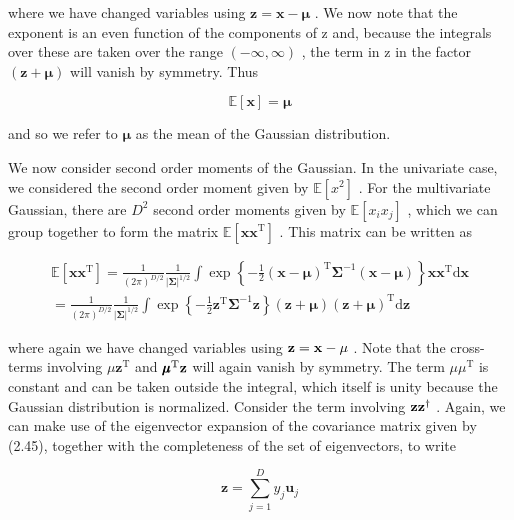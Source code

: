 \documentclass[
  10
]{article}
\begin{document}
where we have changed variables using
\(\mathbf { z } = \mathbf { x } - \pmb { \mu }\) . We now note that the
exponent is an even function of the components of z and, because the
integrals over these are taken over the range \(( - \infty , \infty )\)
, the term in z in the factor \(( \mathbf { z } + \pmb { \mu } )\) will
vanish by symmetry. Thus

\[
\mathbb {E} [ \mathbf {x} ] = \boldsymbol {\mu}\tag{2.59}
\]

and so we refer to \(\pmb { \mu }\) as the mean of the Gaussian
distribution.

We now consider second order moments of the Gaussian. In the univariate
case, we considered the second order moment given by
\(\mathbb { E } [ x ^ { 2 } ]\) . For the multivariate Gaussian, there
are \(D ^ { 2 }\) second order moments given by
\(\mathbb { E } [ x _ { i } x _ { j } ]\) , which we can group together
to form the matrix
\(\mathbb { E } [ { \mathbf { x x } } ^ { \mathrm { T } } ]\) . This
matrix can be written as

\[
\begin{array}{l} \mathbb {E} [ \mathbf {x x} ^ {\mathrm{T}} ] = \frac {1}{(2 \pi) ^ {D / 2}} \frac {1}{| \boldsymbol {\Sigma} | ^ {1 / 2}} \int \exp \left\{- \frac {1}{2} (\mathbf {x} - \boldsymbol {\mu}) ^ {\mathrm{T}} \boldsymbol {\Sigma} ^ {- 1} (\mathbf {x} - \boldsymbol {\mu}) \right\} \mathbf {x x} ^ {\mathrm{T}} \mathrm{d} \mathbf {x} \\ = \frac {1}{(2 \pi) ^ {D / 2}} \frac {1}{| \boldsymbol {\Sigma} | ^ {1 / 2}} \int \exp \left\{- \frac {1}{2} \mathbf {z} ^ {\mathrm{T}} \boldsymbol {\Sigma} ^ {- 1} \mathbf {z} \right\} (\mathbf {z} + \boldsymbol {\mu}) (\mathbf {z} + \boldsymbol {\mu}) ^ {\mathrm{T}} \mathrm{d} \mathbf {z} \end{array}
\]

where again we have changed variables using
\({ \bf z } = { \bf x } - \mu\) . Note that the cross-terms involving
\(\mu \mathbf { z } ^ { \mathrm { T } }\) and
\({ \pmb { \mu } } ^ { \mathrm { T } } { \bf z }\) will again vanish by
symmetry. The term \(\mu \mu ^ { \mathrm { T } }\) is constant and can
be taken outside the integral, which itself is unity because the
Gaussian distribution is normalized. Consider the term involving
\({ \bf z } { \bf z } ^ { \mathrm { \tiny \dag } }\) . Again, we can
make use of the eigenvector expansion of the covariance matrix given by
(2.45), together with the completeness of the set of eigenvectors, to
write

\[
\mathbf {z} = \sum_ {j = 1} ^ {D} y _ {j} \mathbf {u} _ {j}\tag{2.60}
\]
\end{document}
